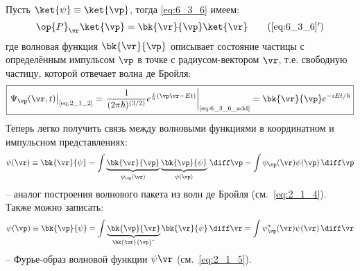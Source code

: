 Пусть $\ket{\psi}\equiv\ket{\vp}$, тогда \eqref{eq:6_3_6} имеем:
\begin{equation}
\label{eq:6_3_6_add}
\op{P}_{\vr}\ket{\vp}=\bk{\vr}{\vp}\ket{\vr}
\tag{\ref{eq:6_3_6}$'$}
\end{equation}%
%
где волновая функция $\bk{\vr}{\vp}$ описывает состояние частицы с определённым импульсом $\vp$ в точке с радиусом-вектором $\vr$, т.е. свободную частицу, которой отвечает волна де Бройля:%
%
\begin{equation}
\label{eq:6_3_9}
\boxed{
	\left. \Psi_{\vp}(\vr,t) \right|_{\text{\eqref{eq:2_1_2}}} = 
	\left. \frac{1}{(2\pi \hbar)^{(3/2)}} e^{\frac{i}{h} (\vp\vr-Et)}  \right|_{\text{\eqref{eq:6_3_6_add}}} = 
	\bk{\vr}{\vp} e^{-iEt/\hbar}
}
\end{equation}%
%
Теперь легко получить связь между волновыми функциями в координатном и импульсном представлениях:%
%
\begin{equation}
\label{eq:6_3_10}
\psi(\vr) \equiv \bk{\vr}{\psi} = 
\int \underbrace{  \bk{\vr}{\vp}  }_ {\psi_{\vp}(\vr)}  \underbrace{ \bk{\vp}{\psi} }_{\psi(\vp)} \, \diff\vp =
\int \psi_{\vp}(\vr) \psi(\vp) \, \diff\vp
\end{equation}%
-- аналог построения волнового пакета из волн де Бройля (см.~\eqref{eq:2_1_4}). Также можно записать:%
%
\begin{equation}
\label{eq:6_3_11}
\psi(\vp) \equiv \bk{\vp}{\psi} = 
\int \underbrace{  \bk{\vp}{\vr}  }_ {\bk{\vr}{\vp}^*} \bk{\vr}{\psi} \, \diff\vr =
\int \psi^*_{\vp}(\vr) \psi(\vr) \, \diff\vr
\end{equation}%
-- Фурье-образ волновой функции $\psi{\vr}$ (см.~\eqref{eq:2_1_5}). 

